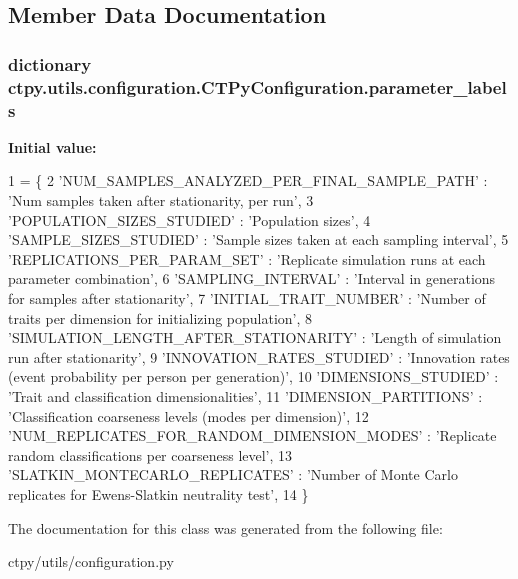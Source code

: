 \subsection{Member Data Documentation}
\hypertarget{classctpy_1_1utils_1_1configuration_1_1_c_t_py_configuration_a32b0c831d473a6aa1968f98d46415820}{
\subsubsection[{parameter\-\_\-labels}]{\setlength{\rightskip}{0pt plus 5cm}dictionary ctpy.\-utils.\-configuration.\-C\-T\-Py\-Configuration.\-parameter\-\_\-labels\hspace{0.3cm}{\ttfamily [static]}}}\label{classctpy_1_1utils_1_1configuration_1_1_c_t_py_configuration_a32b0c831d473a6aa1968f98d46415820}
{\bfseries Initial value\-:}
\begin{DoxyCode}
1 = \{
2         \textcolor{stringliteral}{'NUM\_SAMPLES\_ANALYZED\_PER\_FINAL\_SAMPLE\_PATH'} : \textcolor{stringliteral}{'Num samples taken after stationarity, per run'},
3         \textcolor{stringliteral}{'POPULATION\_SIZES\_STUDIED'} : \textcolor{stringliteral}{'Population sizes'},
4         \textcolor{stringliteral}{'SAMPLE\_SIZES\_STUDIED'} : \textcolor{stringliteral}{'Sample sizes taken at each sampling interval'},
5         \textcolor{stringliteral}{'REPLICATIONS\_PER\_PARAM\_SET'} : \textcolor{stringliteral}{'Replicate simulation runs at each parameter combination'},
6         \textcolor{stringliteral}{'SAMPLING\_INTERVAL'} : \textcolor{stringliteral}{'Interval in generations for samples after stationarity'},
7         \textcolor{stringliteral}{'INITIAL\_TRAIT\_NUMBER'} : \textcolor{stringliteral}{'Number of traits per dimension for initializing population'},
8         \textcolor{stringliteral}{'SIMULATION\_LENGTH\_AFTER\_STATIONARITY'} : \textcolor{stringliteral}{'Length of simulation run after stationarity'},
9         \textcolor{stringliteral}{'INNOVATION\_RATES\_STUDIED'} : \textcolor{stringliteral}{'Innovation rates (event probability per person per generation)'},
10         \textcolor{stringliteral}{'DIMENSIONS\_STUDIED'} : \textcolor{stringliteral}{'Trait and classification dimensionalities'},
11         \textcolor{stringliteral}{'DIMENSION\_PARTITIONS'} : \textcolor{stringliteral}{'Classification coarseness levels (modes per dimension)'},
12         \textcolor{stringliteral}{'NUM\_REPLICATES\_FOR\_RANDOM\_DIMENSION\_MODES'} : \textcolor{stringliteral}{'Replicate random classifications per coarseness
       level'},
13         \textcolor{stringliteral}{'SLATKIN\_MONTECARLO\_REPLICATES'} : \textcolor{stringliteral}{'Number of Monte Carlo replicates for Ewens-Slatkin neutrality
       test'},
14     \}
\end{DoxyCode}


The documentation for this class was generated from the following file\-:\begin{DoxyCompactItemize}
\item 
ctpy/utils/configuration.\-py\end{DoxyCompactItemize}
